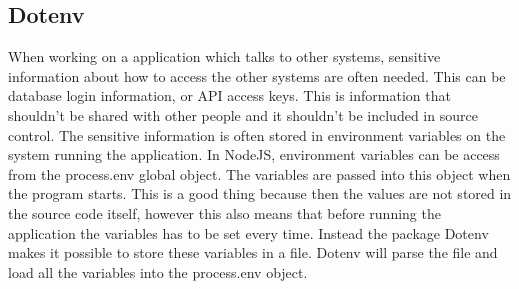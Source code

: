 \subsection{Dotenv}
When working on a application which talks to other systems, sensitive information about how to access the other systems are often needed. This can be database login information, or API access keys. This is information that shouldn't be shared with other people and it shouldn't be included in source control. The sensitive information is often stored in environment variables on the system running the application. In NodeJS, environment variables can be access from the process.env global object. The variables are passed into this object when the program starts. This is a good thing because then the values are not stored in the source code itself, however this also means that before running the application the variables has to be set every time. Instead the package Dotenv makes it possible to store these variables in a file. Dotenv will parse the file and load all the variables into the process.env object. 